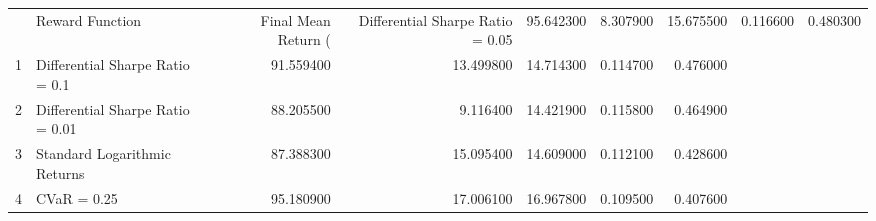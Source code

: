 \begin{tabular}{llrrrrr}
\toprule
 & Reward Function & Final Mean Return (%
 & Differential Sharpe Ratio = 0.05 & 95.642300 & 8.307900 & 15.675500 & 0.116600 & 0.480300 \\
1 & Differential Sharpe Ratio = 0.1 & 91.559400 & 13.499800 & 14.714300 & 0.114700 & 0.476000 \\
2 & Differential Sharpe Ratio = 0.01 & 88.205500 & 9.116400 & 14.421900 & 0.115800 & 0.464900 \\
3 & Standard Logarithmic Returns & 87.388300 & 15.095400 & 14.609000 & 0.112100 & 0.428600 \\
4 & CVaR = 0.25 & 95.180900 & 17.006100 & 16.967800 & 0.109500 & 0.407600 \\
\bottomrule
\end{tabular}
